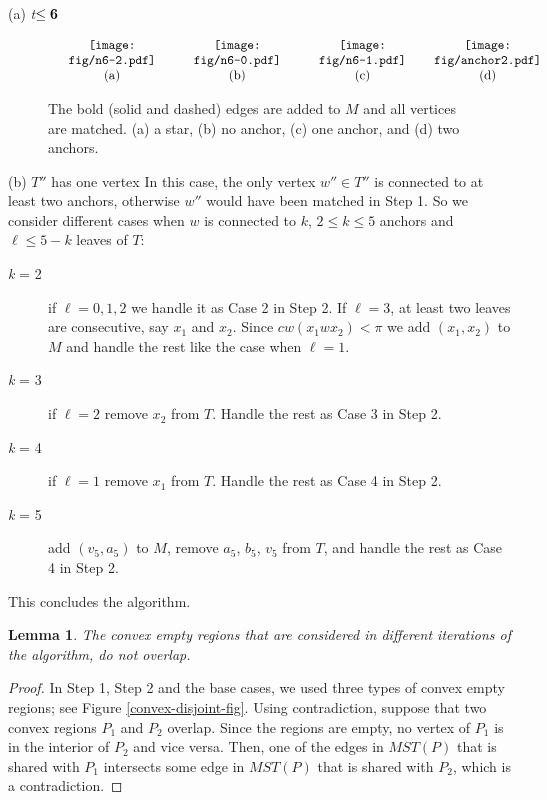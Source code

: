 \documentclass[11pt,a4paper]{article}
\newtheorem{lemma}{Lemma}
\begin{document}
\begin{paragraph}{(a) {\em t}${\bf \le 6}$}
\begin{description}
\begin{figure}[ht]
  \centering
\setlength{\tabcolsep}{0in}
  $\begin{tabular}{cccc}
  \multicolumn{1}{m{.25\columnwidth}}{\centering\texttt{[image: fig/n6-2.pdf]}}
  &\multicolumn{1}{m{.25\columnwidth}}{\centering\texttt{[image: fig/n6-0.pdf]}}
  &\multicolumn{1}{m{.25\columnwidth}}{\centering\texttt{[image: fig/n6-1.pdf]}}
  &\multicolumn{1}{m{.25\columnwidth}}{\centering\texttt{[image: fig/anchor2.pdf]}}\\
  (a) & (b)&(c)&(d)
  \end{tabular}$
  \caption{The bold (solid and dashed) edges are added to $M$ and all vertices are matched. (a) a star, (b) no anchor, (c) one anchor, and (d) two anchors.}
\label{n-small}
\end{figure} 

\end{description}
\end{paragraph}

\begin{paragraph}{(b) $T''$ has one vertex}
In this case, the only vertex $w''\in T''$ is connected to at least two anchors, otherwise $w''$ would have been matched in Step 1. So we consider different cases when $w$ is connected to $k$, $2\le k \le 5$ anchors and $\ell \le 5-k$ leaves of $T$:
\begin{description}
 \item[{\em k} = 2] if $\ell=0,1,2$ we handle it as Case 2 in Step 2. If $\ell=3$, at least two leaves are consecutive, say $x_1$ and $x_2$. Since $cw(x_1wx_2) <\pi$ we add $(x_1,x_2)$ to $M$ and handle the rest like the case when $\ell=1$. 
\item[{\em k} = 3] if $\ell=2$ remove $x_2$ from $T$. Handle the rest as Case 3 in Step 2.
\item[{\em k} = 4] if $\ell=1$ remove $x_1$ from $T$. Handle the rest as Case 4 in Step 2. 
\item[{\em k} = 5] add $(v_5, a_5)$ to $M$, remove $a_5$, $b_5$, $v_5$ from $T$, and handle the rest as Case 4 in Step 2.
\end{description}
\end{paragraph}

This concludes the algorithm.

\begin{lemma}
\label{convex-disjoint-lemma}
The convex empty regions that are considered in different iterations of the algorithm, do not overlap.
\end{lemma}
\begin{proof}
In Step 1, Step 2 and the base cases, we used three types of convex empty regions; see Figure \ref{convex-disjoint-fig}.
Using contradiction, suppose that two convex regions $P_1$ and $P_2$ overlap. Since the regions are empty, no vertex of $P_1$ is in the interior of $P_2$ and vice versa. Then, one of the edges in $MST(P)$ that is shared with $P_1$ intersects some edge in $MST(P)$ that is shared with $P_2$, which is a contradiction.   
\end{proof}
\end{document}
